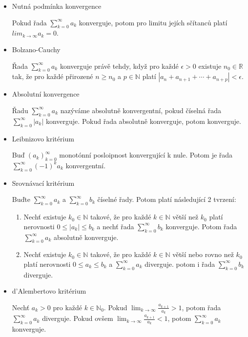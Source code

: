 \begin{itemize}
	\item Nutná podmínka konvergence
	
	Pokud řada $\sum^\infty_{k=0} a_k$ konverguje, potom pro limitu jejích sčítanců platí $lim_{k\to\infty} a_k = 0$.
	
	\item Bolzano-Cauchy
	
	Řada $\sum_{k=0}^\infty a_k$ konverguje právě tehdy, když pro každé $\epsilon > 0$ existuje $n_0 \in \mathbb{R}$ tak, že pro každé přirozené $n \geq n_0$ a $p \in \mathbb{N}$ platí $|a_n + a_{n+1} + \cdots + a_{n+p}| < \epsilon$.
	
	\item Absolutní konvergence
	
	Řadu $\sum_{k=0}^\infty a_k$ nazýváme absolutně konvergentní, pokud číselná řada $\sum_{k=0}^\infty |a_k|$ konverguje. Pokud řada absolutně konverguje, potom konverguje.
	
	\item Leibnizovo kritérium
	
	Buď $(a_k)^\infty_{k=0}$ monotónní posloipnost konvergující k nule. Potom je řada $\sum_{k=0}^\infty (-1)^k a_k$ konvergentní.
	
	\item Srovnávací kritérium
	
	Buďte $\sum_{k=0}^\infty a_k$ a $\sum_{k=0}^\infty b_k$ číselné řady. Potom platí následující 2 tvrzení:
	\begin{enumerate}
		\item Nechť existuje $k_0 \in \mathbb{N}$ takové, že pro každé $k \in \mathbb{N}$ větší než $k_0$ platí nerovnosti $0 \leq |a_k| \leq b_k$ a nechť řada $\sum_{k=0}^\infty b_k$ konverguje. Potom řada $\sum_{k=0}^\infty a_k$ absolutně konverguje.
		\item Nechť existuje $k_0 \in \mathbb{N}$ takové, že pro každé $k \in \mathbb{N}$ větší nebo rovno než $k_0$ platí nerovnosti $0 \leq a_k \leq b_k$ a $\sum_{k=0}^\infty a_k$ diverguje. potom i řada $\sum_{k=0}^\infty b_k$ diverguje.
	\end{enumerate}
	
	\item d'Alembertovo kritérium
	
	Nechť $a_k > 0$ pro každé $k \in \mathbb{N}_0$. Pokud $\lim_{k\to\infty} \frac{a_{k+1}}{a_k} > 1$, potom řada $\sum_{k=0}^\infty a_k$ diverguje. Pokud ovšem $\lim_{k\to\infty} \frac{a_{k+1}}{a_k} < 1$, potom $\sum_{k=0}^\infty a_k$ konverguje. 
\end{itemize}

